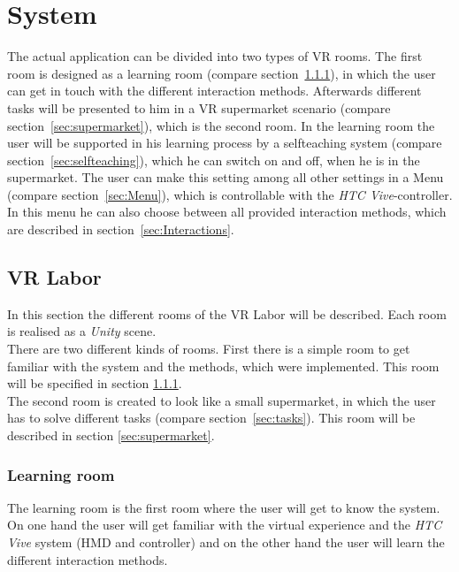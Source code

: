
\section{System}\label{sec:System}
The actual application can be divided into two types of VR rooms. The first room is designed as a learning room (compare section~\ref{sec:Learningroom}), in which the user can get in touch with the different interaction methods. Afterwards different tasks will be presented to him in a VR supermarket scenario (compare section~\ref{sec:supermarket}), which is the second room. In the learning room the user will be supported in his learning process by a selfteaching system (compare section~\ref{sec:selfteaching}), which he can switch on and off, when he is in the supermarket. The user can make this setting among all other settings in a Menu  (compare section~\ref{sec:Menu}), which is controllable with the \textit{HTC Vive}-controller. In this menu he can also choose between all provided interaction methods, which are described in section~\ref{sec:Interactions}.

\subsection{VR Labor}\label{sec:VRLabor}
In this section the different rooms of the VR Labor will be described. Each room is realised as a \textit{Unity} scene.\\
There are two different kinds of rooms. First there is a simple room to get familiar with the system and the methods, which were implemented. This room will be specified in  section \ref{sec:Learningroom}.\\
The second room is created to look like a small supermarket, in which the user has to solve different tasks (compare section~\ref{sec:tasks}). This room will be described in section \ref{sec:supermarket}.

\subsubsection{Learning room} \label{sec:Learningroom}
The learning room is the first room where the user will get to know the system. On one hand the user will get familiar with the virtual experience and the \textit{HTC Vive} system (HMD and controller) and on the other hand the user will learn the different interaction methods. 


